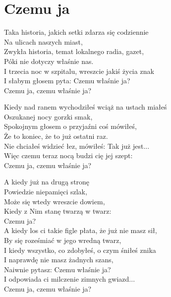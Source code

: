 \section{Czemu ja}
\begin{text}
Taka historia, jakich setki zdarza się codziennie\\
Na ulicach naszych miast,\\
Zwykła historia, temat lokalnego radia, gazet,\\
Póki nie dotyczy właśnie nas.\\
I trzecia noc w szpitalu, wreszcie jakiś życia znak\\
I słabym głosem pyta: Czemu właśnie ja?\\
Czemu ja, czemu właśnie ja?

Kiedy nad ranem wychodziłeś wciąż na ustach miałeś\\
Oszukanej nocy gorzki smak,\\
Spokojnym głosem o przyjaźni coś mówiłeś,\\
Że to koniec, że to już ostatni raz.\\
Nie chciałeś widzieć łez, mówiłeś: Tak już jest...\\
Więc czemu teraz nocą budzi cię jej szept:\\
Czemu ja, czemu właśnie ja?

A kiedy już na drugą stronę\\
Powiedzie niepamięci szlak,\\
Może się wtedy wreszcie dowiem,\\
Kiedy z Nim stanę twarzą w twarz:\\
Czemu ja?\\
A kiedy los ci takie figle płata, że już nie masz sił,\\
By się roześmiać w jego wredną twarz,\\
I kiedy wszystko, co zdobyłeś, o czym śniłeś znika\\
I naprawdę nie masz żadnych szans,\\
Naiwnie pytasz: Czemu właśnie ja?\\
I odpowiada ci milczenie zimnych gwiazd...\\
Czemu ja, czemu właśnie ja?
\end{text}